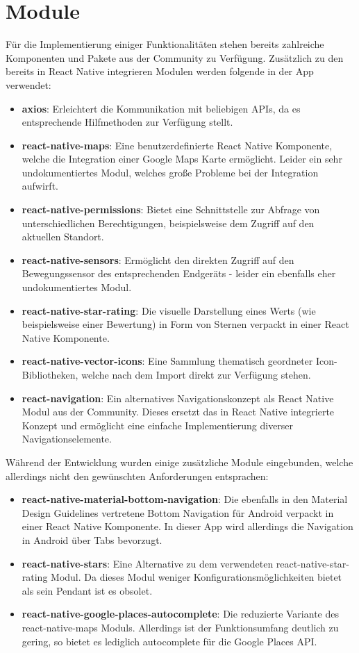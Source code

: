 \section{Module}
Für die Implementierung einiger Funktionalitäten stehen bereits zahlreiche Komponenten und Pakete aus der Community zu Verfügung.
Zusätzlich zu den bereits in React Native integrieren Modulen werden folgende in der App verwendet:
\begin{itemize}
	\item \textbf{axios}: Erleichtert die Kommunikation mit beliebigen APIs, da es entsprechende Hilfmethoden zur Verfügung stellt.
	\item \textbf{react-native-maps}: Eine benutzerdefinierte React Native Komponente, welche die Integration einer Google Maps Karte ermöglicht. Leider ein sehr undokumentiertes Modul, welches große Probleme bei der Integration aufwirft.
	\item \textbf{react-native-permissions}: Bietet eine Schnittstelle zur Abfrage von unterschiedlichen Berechtigungen, beispielsweise dem Zugriff auf den aktuellen Standort.
	\item \textbf{react-native-sensors}: Ermöglicht den direkten Zugriff auf den Bewegungssensor des entsprechenden Endgeräts - leider ein ebenfalls eher undokumentiertes Modul.
	\item \textbf{react-native-star-rating}: Die visuelle Darstellung eines Werts (wie beispielsweise einer Bewertung) in Form von Sternen verpackt in einer React Native Komponente.
	\item \textbf{react-native-vector-icons}: Eine Sammlung thematisch geordneter Icon-Bi\-blio\-theken, welche nach dem Import direkt zur Verfügung stehen.
	\item \textbf{react-navigation}: Ein alternatives Navigationskonzept als React Native Modul aus der Community. Dieses ersetzt das in React Native integrierte Konzept und ermöglicht eine einfache Implementierung diverser Navigationselemente.
\end{itemize}

Während der Entwicklung wurden einige zusätzliche Module eingebunden, welche allerdings nicht den gewünschten Anforderungen entsprachen:
\begin{itemize}
	\item \textbf{react-native-material-bottom-navigation}: Die ebenfalls in den Material Design Guidelines vertretene Bottom Navigation für Android verpackt in einer React Native Komponente. In dieser App wird allerdings die Navigation in Android über Tabs bevorzugt.
	\item \textbf{react-native-stars}: Eine Alternative zu dem verwendeten react-native-star-rating Modul. Da dieses Modul weniger Konfigurationsmöglichkeiten bietet als sein Pendant ist es obsolet.
	\item \textbf{react-native-google-places-autocomplete}: Die reduzierte Variante des react-native-maps Moduls. Allerdings ist der Funktionsumfang deutlich zu gering, so bietet es lediglich autocomplete für die Google Places API.
\end{itemize}

